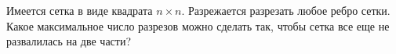 Имеется сетка в виде квадрата $n \times n$. Разрежается разрезать любое ребро сетки. Какое максимальное число разрезов можно
сделать так, чтобы сетка все еще не развалилась на две части?